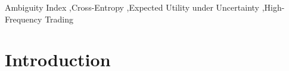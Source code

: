 \documentclass[preprint,12pt,authoryear]{elsarticle}
\begin{document}
\begin{frontmatter}


\begin{keyword}
Ambiguity Index \sep Cross-Entropy \sep Expected Utility under Uncertainty \sep High-Frequency Trading


\end{keyword}

\end{frontmatter}



\section{Introduction}


\end{document}
